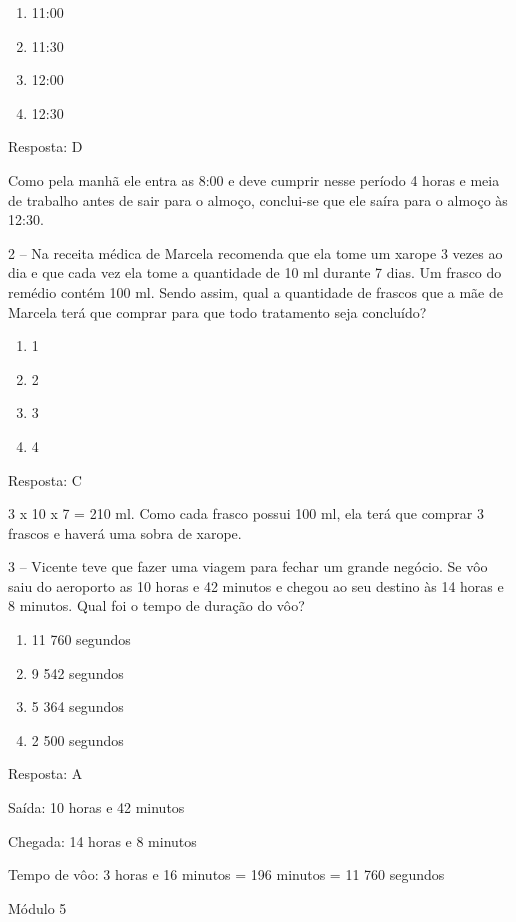 \begin{enumerate}
\def\labelenumi{\alph{enumi})}
\item
  11:00
\item
  11:30
\item
  12:00
\item
  12:30
\end{enumerate}

Resposta: D

Como pela manhã ele entra as 8:00 e deve cumprir nesse período 4 horas e
meia de trabalho antes de sair para o almoço, conclui-se que ele saíra
para o almoço às 12:30.

2 -- Na receita médica de Marcela recomenda que ela tome um xarope 3
vezes ao dia e que cada vez ela tome a quantidade de 10 ml durante 7
dias. Um frasco do remédio contém 100 ml. Sendo assim, qual a quantidade
de frascos que a mãe de Marcela terá que comprar para que todo
tratamento seja concluído?

\begin{enumerate}
\def\labelenumi{\alph{enumi})}
\item
  1
\item
  2
\item
  3
\item
  4
\end{enumerate}

Resposta: C

3 x 10 x 7 = 210 ml. Como cada frasco possui 100 ml, ela terá que
comprar 3 frascos e haverá uma sobra de xarope.

3 -- Vicente teve que fazer uma viagem para fechar um grande negócio. Se
vôo saiu do aeroporto as 10 horas e 42 minutos e chegou ao seu destino
às 14 horas e 8 minutos. Qual foi o tempo de duração do vôo?

\begin{enumerate}
\def\labelenumi{\alph{enumi})}
\item
  11 760 segundos
\item
  9 542 segundos
\item
  5 364 segundos
\item
  2 500 segundos
\end{enumerate}

Resposta: A

Saída: 10 horas e 42 minutos

Chegada: 14 horas e 8 minutos

Tempo de vôo: 3 horas e 16 minutos = 196 minutos = 11 760 segundos

Módulo 5

